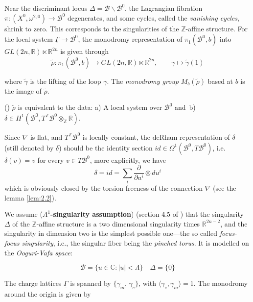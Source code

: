 \documentclass{article}
\begin{document}
Near the discriminant locus $\Delta=\mathcal{B}\backslash\mathcal{B}^{0}$, the Lagrangian fibration $\pi:(X^{0},\omega^{2,0})\to\mathcal{B}^{0}$ degenerates, and some cycles, called the \textit{vanishing cycles}, shrink to zero. This corresponds to the singularities of the $\mathbb{Z}$-affine structure. For the local system $\underline{\Gamma}\to\mathcal{B}^{0}$, the monodromy representation of $\pi_{1}(\mathcal{B}^{0},b)$ into $GL(2n,\mathbb{R})\ltimes\mathbb{R}^{2n}$ is given through
\[\widetilde{\rho}:\pi_{1}(\mathcal{B}^{0},b) \to GL(2n,\mathbb{R})\ltimes\mathbb{R}^{2n},\qquad\gamma\longmapsto\widetilde{\gamma}(1)\]

where $\widetilde{\gamma}$ is the lifting of the loop $\gamma$. The \textit{monodromy group} $M_{b}(\widetilde{\rho})$ based at $b$ is the image of $\widetilde{\rho}$.

\begin{proposition}
(\cite{kontsevich2014wall}) $\widetilde{\rho}$ is equivalent to the data: a) A local system over $\mathcal{B}^{0}$ and\,\,\,b) $\delta\in H^{1}(\mathcal{B}^{0},T^{\mathbb{Z}}\mathcal{B}^{0}\otimes_{\mathbb{Z}}\mathbb{R})$.
\end{proposition}

\begin{remark}
Since $\nabla$ is flat, and $T^{\mathbb{Z}}\mathcal{B}^{0}$ is locally constant, the deRham representation of $\delta$ (still denoted by $\delta$) should be the identity section $id\in \Omega^{1}(\mathcal{B}^{0},T\mathcal{B}^{0})$, i.e. $\delta(v)=v$ for every $v\in T\mathcal{B}^{0}$, more explicitly, we have \[\delta=id=\sum_{i}\frac{\partial}{\partial u^{i}}\otimes du^{i}\]
which is obviously closed by the torsion-freeness of the connection $\nabla$ (see the lemma \ref{lem:2.2}).
\end{remark}

We assume (\textbf{$A^{1}$-singularity assumption}) (section 4.5 of \cite{kontsevich2014wall}) that the singularity $\Delta$ of the $\mathbb{Z}$-affine structure is a two dimensional singularity times $\mathbb{R}^{2n-2}$, and the singularity in dimension two is the simplest possible one---the so called \textit{focus-focus singularity}, i.e., the singular fiber being the \textit{pinched torus}. It is modelled on the \textit{Ooguri-Vafa space}\cite{chan2010ooguri}:

\[\mathcal{B}=\{u\in\mathbb{C}:|u|<\Lambda\}\quad \Delta=\{0\}\]

The charge lattices $\underline{\Gamma}$ is spanned by $\{\gamma_{m}$, $\gamma_{e}\}$, with $\langle\gamma_{e},\gamma_{m}\rangle=1$. The monodromy around the origin is given by 
\end{document}
